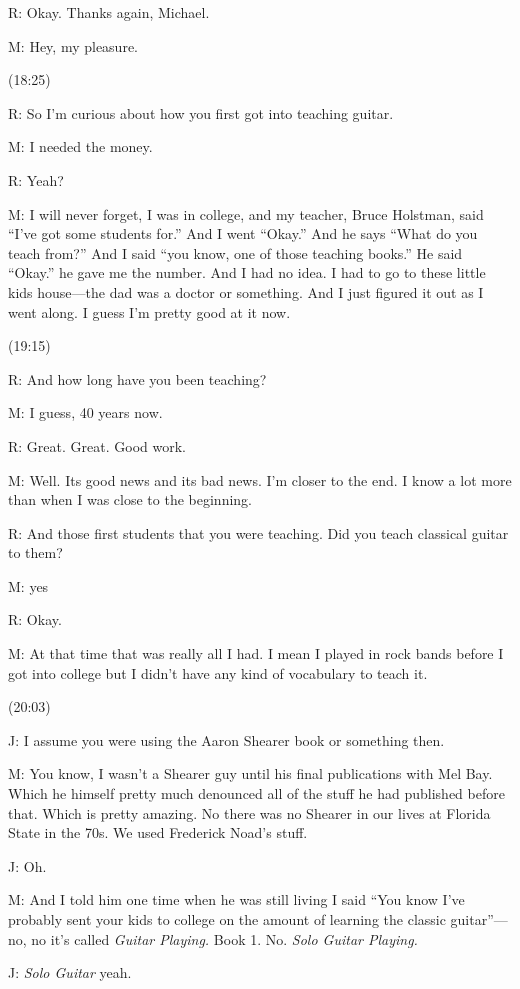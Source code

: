 \documentclass[11pt]{article}
\begin{document}
R: Okay. Thanks again, Michael.

M: Hey, my pleasure.

(18:25)

R: So I'm curious about how you first got into teaching guitar.

M: I needed the money.

R: Yeah?

M: I will never forget, I was in college, and my teacher, Bruce Holstman, said ``I've got some students for.'' And I went ``Okay.'' And he says ``What do you teach from?'' And I said ``you know, one of those teaching books.'' He said ``Okay.'' he gave me the number. And I had no idea. I had to go to these little kids house---the dad was a doctor or something. And I just figured it out as I went along. I guess I'm pretty good at it now. 

(19:15)

R: And how long have you been teaching?

M: I guess, 40 years now. 

R: Great. Great. Good work. 

M: Well. Its good news and its bad news. I'm closer to the end. I know a lot more than when I was close to the beginning. 

R: And those first students that you were teaching. Did you teach classical guitar to them?

M: yes

R: Okay.

M: At that time that was really all I had. I mean I played in rock bands before I got into college but I didn't have any kind of vocabulary to teach it. 

(20:03)

J: I assume you were using the Aaron Shearer book or something then.

M: You know, I wasn't a Shearer guy until his final publications with Mel Bay. Which he himself pretty much denounced all of the stuff he had published before that. Which is pretty amazing. No there was no Shearer in our lives at Florida State in the 70s. We used Frederick Noad's stuff. 

J: Oh. 

M: And I told him one time when he was still living I said ``You know I've probably sent your kids to college on the amount of learning the classic guitar''---no, no it's called \emph{Guitar Playing.} Book 1. No. \emph{Solo Guitar Playing.}

J: \emph{Solo Guitar} yeah. 
\end{document}
